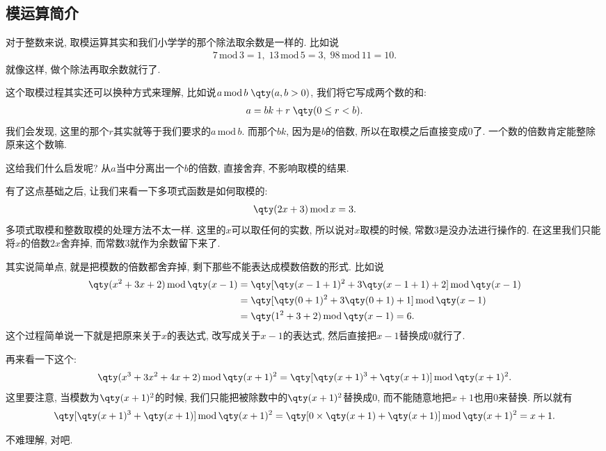 \documentclass{ctexbook}
\newcommand{\m}{\,\mathrm{mod}\,}
\begin{document}
{\subsection{模运算简介}
对于整数来说, 取模运算其实和我们小学学的那个除法取余数是一样的. 比如说
\begin{align*}
7\m3=1,\;13\m5=3,\;98\m11=10
.\end{align*}
就像这样, 做个除法再取余数就行了. \par
这个取模过程其实还可以换种方式来理解, 比如说$a\m b\;\qty(a,b>0)$, 我们将它写成两个数的和: 
\begin{align*}
a=bk+r\;\qty(0\le r<b)
.\end{align*}
我们会发现, 这里的那个$r$其实就等于我们要求的$a\m b$. 而那个$bk$, 因为是$b$的倍数, 所以在取模之后直接变成$0$了. 一个数的倍数肯定能整除原来这个数嘛. \par
这给我们什么启发呢? 从$a$当中分离出一个$b$的倍数, 直接舍弃, 不影响取模的结果. \par
有了这点基础之后, 让我们来看一下多项式函数是如何取模的: 
\begin{align*}
\qty(2x+3)\m x=3
.\end{align*}
多项式取模和整数取模的处理方法不太一样. 这里的$x$可以取任何的实数, 所以说对$x$取模的时候, 常数$3$是没办法进行操作的. 在这里我们只能将$x$的倍数$2x$舍弃掉, 而常数$3$就作为余数留下来了. \par
其实说简单点, 就是把模数的倍数都舍弃掉, 剩下那些不能表达成模数倍数的形式. 比如说
\begin{align*}
\qty(x^{2}+3x+2)\m\qty(x-1)={}&\qty[\qty(x-1+1)^{2}+3\qty(x-1+1)+2]\m\qty(x-1)\\
={}&\qty[\qty(0+1)^{2}+3\qty(0+1)+1]\m\qty(x-1)\\
={}&\qty(1^{2}+3+2)\m\qty(x-1)=6
.\end{align*}
这个过程简单说一下就是把原来关于$x$的表达式, 改写成关于$x-1$的表达式, 然后直接把$x-1$替换成$0$就行了. \par
再来看一下这个: 
\begin{align*}
\qty(x^{3}+3x^{2}+4x+2)\m\qty(x+1)^{2}=\qty[\qty(x+1)^{3}+\qty(x+1)]\m\qty(x+1)^{2}
.\end{align*}
这里要注意, 当模数为$\qty(x+1)^{2}$的时候, 我们只能把被除数中的$\qty(x+1)^{2}$替换成$0$, 而不能随意地把$x+1$也用$0$来替换. 所以就有
\begin{align*}
\qty[\qty(x+1)^{3}+\qty(x+1)]\m\qty(x+1)^{2}=\qty[0\times\qty(x+1)+\qty(x+1)]\m\qty(x+1)^{2}=x+1
.\end{align*}\par
不难理解, 对吧. \par
}
\end{document}
